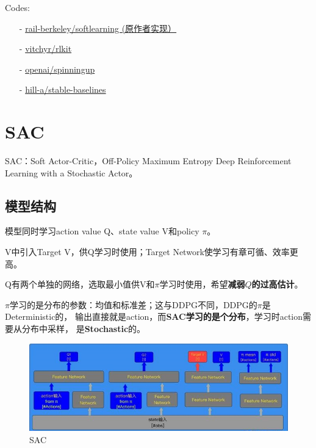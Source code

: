 Codes:
\begin{itemize}
\setlength{\parskip}{0pt}
\item[-]
\href{https://github.com/rail-berkeley/softlearning}{rail-berkeley/softlearning (原作者实现）}
\item[-]
\href{https://github.com/vitchyr/rlkit}{vitchyr/rlkit}
\item[-]
\href{https://github.com/openai/spinningup}{openai/spinningup}
\item[-]
\href{https://github.com/hill-a/stable-baselines}{hill-a/stable-baselines}
\end{itemize}


\section{SAC}


SAC：Soft Actor-Critic，Off-Policy Maximum Entropy Deep Reinforcement 
Learning with a Stochastic Actor。


\subsection{模型结构}

模型同时学习action value Q、state value V和policy $\pi$。

V中引入Target V，供Q学习时使用；Target Network使学习有章可循、效率更高。

Q有两个单独的网络，选取最小值供V和$\pi$学习时使用，希望{\bf 减弱$Q$的过高估计}。

$\pi$学习的是分布的参数：均值和标准差；这与DDPG不同，DDPG的$\pi$是Deterministic的，
输出直接就是action，而{\bf SAC学习的是个分布}，学习时action需要从分布中采样，
是{\bf Stochastic}的。

\begin{figure}[!htb]
\centering
\includegraphics[scale=1.0]{pix/sac.jpg}
\caption{SAC}
\end{figure}


